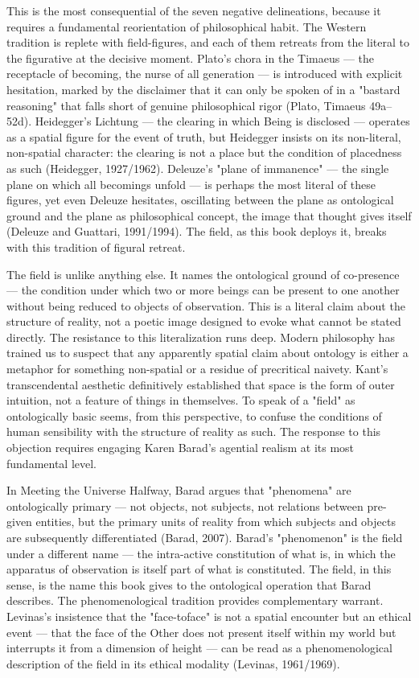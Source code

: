 This is the most consequential of the seven negative delineations, because it requires a fundamental reorientation of philosophical habit. The Western tradition is replete with field-figures, and each of them retreats from the literal to the figurative at the decisive moment. Plato's chora in the Timaeus — the receptacle of becoming, the nurse of all generation — is introduced with explicit hesitation, marked by the disclaimer that it can only be spoken of in a "bastard reasoning" that falls short of genuine philosophical rigor (Plato, Timaeus 49a– 52d). Heidegger's Lichtung — the clearing in which Being is disclosed — operates as a spatial figure for the event of truth, but Heidegger insists on its non-literal, non-spatial character: the clearing is not a place but the condition of placedness as such (Heidegger, 1927/1962). Deleuze's "plane of immanence" — the single plane on which all becomings unfold — is perhaps the most literal of these figures, yet even Deleuze hesitates, oscillating between the plane as ontological ground and the plane as philosophical concept, the image that thought gives itself (Deleuze and Guattari, 1991/1994). The field, as this book deploys it, breaks with this tradition of figural retreat.

The field is unlike anything else. It names the ontological ground of co-presence — the condition under which two or more beings can be present to one another without being reduced to objects of observation. This is a literal claim about the structure of reality, not a poetic image designed to evoke what cannot be stated directly. The resistance to this literalization runs deep. Modern philosophy has trained us to suspect that any apparently spatial claim about ontology is either a metaphor for something non-spatial or a residue of precritical naivety. Kant's transcendental aesthetic definitively established that space is the form of outer intuition, not a feature of things in themselves. To speak of a "field" as ontologically basic seems, from this perspective, to confuse the conditions of human sensibility with the structure of reality as such. The response to this objection requires engaging Karen Barad's agential realism at its most fundamental level.

In Meeting the Universe Halfway, Barad argues that "phenomena" are ontologically primary — not objects, not subjects, not relations between pre-given entities, but the primary units of reality from which subjects and objects are subsequently differentiated (Barad, 2007). Barad's "phenomenon" is the field under a different name — the intra-active constitution of what is, in which the apparatus of observation is itself part of what is constituted. The field, in this sense, is the name this book gives to the ontological operation that Barad describes. The phenomenological tradition provides complementary warrant. Levinas's insistence that the "face-toface" is not a spatial encounter but an ethical event — that the face of the Other does not present itself within my world but interrupts it from a dimension of height — can be read as a phenomenological description of the field in its ethical modality (Levinas, 1961/1969).

